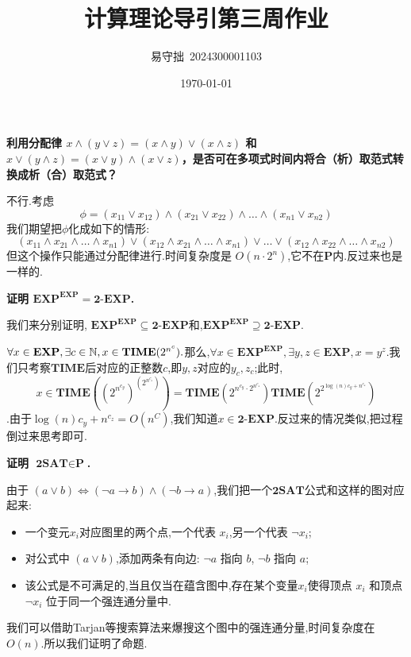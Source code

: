 \documentclass{homework}
\author{易守拙\ 2024300001103}
\date{\today}
\title{计算理论导引第三周作业}
\begin{document}
 \maketitle
	
	\question \textbf{利用分配律 $x \land (y \lor z) = (x \land y) \lor (x \land z)$ 和 $x \lor (y \land z) = (x \lor y) \land (x \lor z)$，是否可在多项式时间内将合（析）取范式转换成析（合）取范式？}
	
	\begin{sol}
	不行.考虑$$ \phi = (x_{11} \lor x_{12}) \land (x_{21} \lor x_{22}) \land \dots
	\land (x_{n1} \lor x_{n2}) $$
	我们期望把$\phi$化成如下的情形:
	$$ (x_{11} \land x_{21} \land \dots \land x_{n1}) \lor (x_{12}
	\land x_{21} \land \dots \land x_{n1}) \lor \dots \lor (x_{12} \land
	x_{22} \land \dots \land x_{n2}) $$
	但这个操作只能通过分配律进行.时间复杂度是 $O(n \cdot2^n)$,它不在$\textbf{P}$内.反过来也是一样的.
		
	\end{sol}
	\question \textbf{证明 $\textbf{EXP}^{\textbf{EXP}} = \textbf{2-EXP}$.}
	
	\begin{sol}
		我们来分别证明, $\textbf{EXP}^{\textbf{EXP}} \subseteq \textbf{2-EXP} $和,$\textbf{EXP}^{\textbf{EXP}} \supseteq \textbf{2-EXP}$.
		
		$\forall x \in \textbf{EXP} , \exists c \in \mathbb{N} , x \in \textbf{TIME}(2^{n^c}). $那么,$\forall x \in \textbf{EXP}^{\textbf{EXP}} , \exists y,z \in \textbf{EXP}, x  = y^z.$我们只考察$\textbf{TIME}$后对应的正整数$c$,即$y,z$对应的$y_c,z_c$;此时,$$x \in \textbf{TIME}((2^{n^{c_y}})^{(2^{n^{c_z}})}) =  \textbf{TIME}(2^{n^{c_y} \cdot 2^{n^{c_z}}})  \textbf{TIME}(2^{2^{\log(n)c_y+n^{c_z}}})
		$$.由于$\log(n)c_y+n^{c_z} = O(n^{C})$,我们知道$x \in   \textbf{2-EXP}$.反过来的情况类似,把过程倒过来思考即可.
		
	\end{sol}
	
	\question \textbf{证明 $\textbf{2SAT} \in \textbf{P}$.}
	
	\begin{sol}
		由于 $(a \lor b) \iff (\neg a \longrightarrow b) \land (\neg b \longrightarrow a)$,我们把一个$\textbf{2SAT}$公式和这样的图对应起来:
		\begin{itemize}
					\item 一个变元$x_i$对应图里的两个点,一个代表 $x_i$,另一个代表 $\neg x_i$;
					\item 对公式中 $(a \lor b)$,添加两条有向边: $\neg a$ 指向 $b$, $\neg b$ 指向 $a$;
					\item 该公式是不可满足的,当且仅当在蕴含图中,存在某个变量$x_i$使得顶点 $x_i$ 和顶点 $\neg x_i$ 位于同一个强连通分量中.
		\end{itemize}
		
		我们可以借助Tarjan等搜索算法来爆搜这个图中的强连通分量,时间复杂度在$O(n)$.所以我们证明了命题.

		
		
	\end{sol}
	
\end{document}
